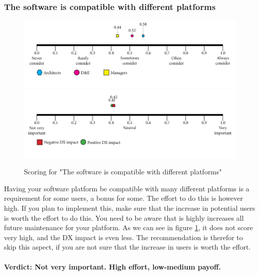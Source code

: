 \documentclass{article}
\begin{document}
\subsubsection{The software is compatible with different platforms}
\begin{figure}[H]
\centering
\includegraphics[width=\linewidth]{scorelines/aspect12.png}
\includegraphics[width=\linewidth]{dxscorelines/dxaspect12.png}
\caption{Scoring for "The software is compatible with different platforms"}
\label{fig:aspect12}
\end{figure}
Having your software platform be compatible with many different platforms is a requirement for some users, a bonus for some. The effort to do this is however high. If you plan to implement this, make sure that the increase in potential users is worth the effort to do this. You need to be aware that is highly increases all future maintenance for your platform. As we can see in figure \ref{fig:aspect12}, it does not score very high, and the DX impact is even less. The recommendation is therefor to skip this aspect, if you are not sure that the increase in users is worth the effort. \\ \\
\textbf{Verdict: Not very important. High effort, low-medium payoff.}
\end{document}
